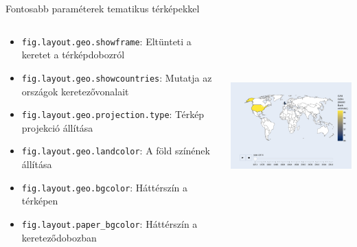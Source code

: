 \documentclass[english, aspectratio=169]{beamer}
\begin{document}
	\begin{frame}{Fontosabb paraméterek tematikus térképekkel}
		\begin{columns}
			\begin{column}{.5\textwidth}
				\begin{itemize}
					\item \texttt{fig.layout.geo.showframe}: Eltünteti a keretet a térképdobozról
					\item \texttt{fig.layout.geo.showcountries}: Mutatja az országok keretezővonalait
					\item \texttt{fig.layout.geo.projection.type}: Térkép projekció állítása
					\item \texttt{fig.layout.geo.landcolor}: A föld színének állítása
					\item \texttt{fig.layout.geo.bgcolor}: Háttérszín a térképen
					\item \texttt{fig.layout.paper\_bgcolor}: Háttérszín a kereteződobozban
				\end{itemize}
			\end{column}
			\begin{column}{.5\textwidth}
				\begin{center}
					\includegraphics[width=7cm, height=7cm, keepaspectratio]{images/scatter_22.png}
				\end{center}
			\end{column}
		\end{columns}
	\end{frame}
	
\end{document}
